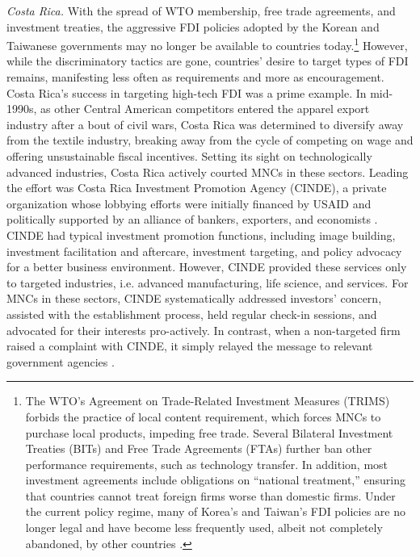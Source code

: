 \textit{Costa Rica.} With the spread of WTO membership, free trade agreements,
and investment treaties, the aggressive FDI policies adopted by the Korean and
Taiwanese governments may no longer be available to countries
today.\footnote{The WTO's Agreement on Trade-Related Investment Measures (TRIMS)
  forbids the practice of local content requirement, which forces MNCs to
  purchase local products, impeding free trade. Several Bilateral Investment
  Treaties (BITs) and Free Trade Agreements (FTAs) further ban other performance
  requirements, such as technology transfer. In addition, most investment
  agreements include obligations on ``national treatment,'' ensuring that
  countries cannot treat foreign firms worse than domestic firms. Under the
  current policy regime, many of Korea's and Taiwan's FDI policies are no longer
  legal and have become less frequently used, albeit not completely abandoned,
  by other countries \citep{Cosbey2015}.} However, while the discriminatory
tactics are gone, countries' desire to target types of FDI remains, manifesting
less often as requirements and more as encouragement. Costa Rica's success in
targeting high-tech FDI was a prime example. In mid-1990s, as other Central
American competitors entered the apparel export industry after a bout of civil
wars, Costa Rica was determined to diversify away from the textile industry,
breaking away from the cycle of competing on wage and offering unsustainable
fiscal incentives. Setting its sight on technologically advanced industries,
Costa Rica actively courted MNCs in these sectors. Leading the effort was Costa
Rica Investment Promotion Agency (CINDE), a private organization whose lobbying
efforts were initially financed by USAID and politically supported by an
alliance of bankers, exporters, and economists \citep{Clark1995}. CINDE had
typical investment promotion functions, including image building, investment
facilitation and aftercare, investment targeting, and policy advocacy for a
better business environment. However, CINDE provided these services only to
targeted industries, i.e. advanced manufacturing, life science, and services.
For MNCs in these sectors, CINDE systematically addressed investors' concern,
assisted with the establishment process, held regular check-in sessions, and
advocated for their interests pro-actively. In contrast, when a non-targeted
firm raised a complaint with CINDE, it simply relayed the message to relevant
government agencies \citep{OECD2013}.

